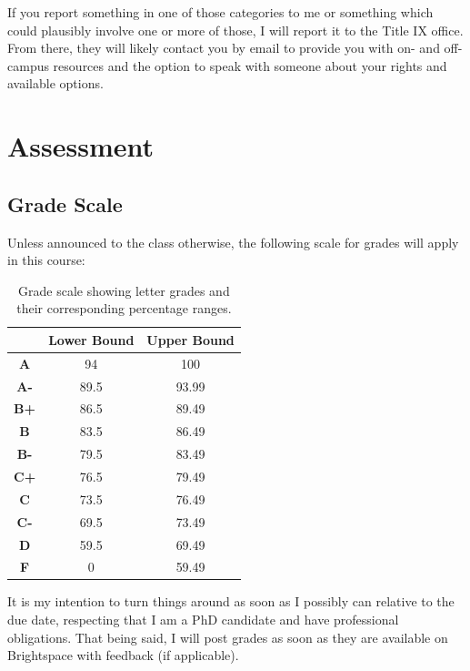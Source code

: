 \documentclass[12pt]{article}
\begin{document}
\par{If you report something in one of those categories to me or something which could plausibly involve one or more of those, I will report it to the Title IX office. From there, they will likely contact you by email to provide you with on- and off-campus resources and the option to speak with someone about your rights and available options.}

\section*{Assessment}
\subsection*{Grade Scale}
Unless announced to the class otherwise, the following scale for grades will apply in this course:

\begin{center}
\begin{table}[H]
\centering
\caption{Grade scale showing letter grades and their corresponding percentage ranges.}
\begin{tabular}{ccc}
    \toprule
     & Lower Bound & Upper Bound \\
    \midrule
    \textbf{A}  & 94   & 100   \\
    \textbf{A-} & 89.5 & 93.99 \\
    \textbf{B+} & 86.5 & 89.49 \\
    \textbf{B}  & 83.5 & 86.49 \\
    \textbf{B-} & 79.5 & 83.49 \\
    \textbf{C+} & 76.5 & 79.49 \\
    \textbf{C}  & 73.5 & 76.49 \\
    \textbf{C-} & 69.5 & 73.49 \\
    \textbf{D}  & 59.5 & 69.49 \\
    \textbf{F}  & 0    & 59.49 \\
    \bottomrule
\end{tabular}
\end{table}
\end{center}
\vspace{1em}
\par{It is my intention to turn things around as soon as I possibly can relative to the due date, respecting that I am a PhD candidate and have professional obligations. That being said, I will post grades as soon as they are available on Brightspace with feedback (if applicable).}
\end{document}
